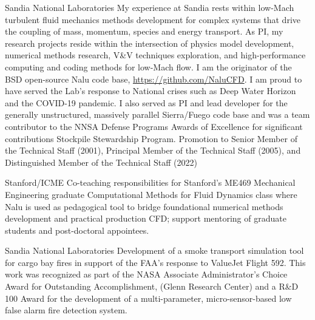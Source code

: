 \documentclass[letterpaper]{twentysecondcv_spd} %
\begin{document}
\begin{twenty} %

    {Sandia National Laboratories} {My experience at Sandia rests within low-Mach 
    turbulent fluid mechanics methods development for complex systems that drive the coupling of mass, momentum, species and energy transport. 
    As PI, my research projects reside within the intersection of physics model development, numerical methods research, V\&V techniques exploration, and 
    high-performance computing and coding methods for low-Mach flow. I am the originator of the BSD open-source Nalu
    code base, \underline{https://github.com/NaluCFD}. I am proud to have served the Lab's response to National crises 
    such as Deep Water Horizon and the COVID-19 pandemic. I also served as PI and lead developer for the generally unstructured, massively 
    parallel Sierra/Fuego code base and was a team contributor to the NNSA Defense Programs Awards of Excellence for 
    significant contributions Stockpile Stewardship Program. Promotion to Senior Member of the Technical Staff (2001), Principal Member of the Technical Staff (2005), and 
    Distinguished Member of the Technical Staff (2022)}

    {Stanford/ICME} {Co-teaching responsibilities for Stanford's ME469 Mechanical Engineering graduate Computational 
   Methods for Fluid Dynamics class where Nalu is used as pedagogical tool to bridge foundational numerical methods development and practical production CFD;
   support mentoring of graduate students and post-doctoral appointees.}
    
   {Sandia National Laboratories}  {Development of a smoke transport simulation tool for cargo bay 
  fires in support of the FAA's response to ValueJet Flight 592. This work was recognized as part of the NASA Associate Administrator's Choice Award for Outstanding Accomplishment, (Glenn Research Center) 
  and a R\&D 100 Award for the development of a multi-parameter, micro-sensor-based low false alarm fire detection system.}
  
\end{twenty}



\end{document}
